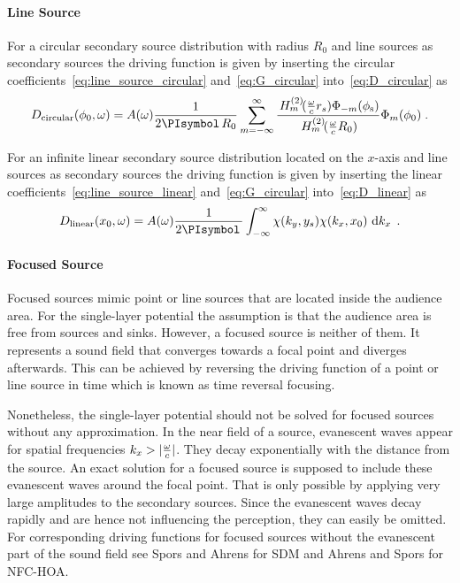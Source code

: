 \paragraph{Line Source}
%
For a circular secondary source distribution with radius $R_0$ and line sources
as secondary sources the driving function is given by inserting the
circular coefficients~\eqref{eq:line_source_circular} and~\eqref{eq:G_circular}
into~\eqref{eq:D_circular} as
%
\begin{equation}
    D_{\text{circular}}(\phi_0,\omega) = A(\omega) \frac{1}{2\PI R_0}
        \sum_{m=-\infty}^{\infty}
        \frac{\H{m}{2}(\omegac r_s) \Phi_{-m}(\phi_\text{s})}
        {\H{m}{2}(\omegac R_0)} \Phi_m(\phi_0) \qp
    \label{eq:D_nfchoa_ls_2D}
\end{equation}
%

For an infinite linear secondary source distribution located on the $x$-axis and
line sources as secondary sources the driving function is given by inserting the
linear coefficients~\eqref{eq:line_source_linear} and~\eqref{eq:G_circular}
into~\eqref{eq:D_linear} as
%
\begin{equation}
    D_\text{linear}(x_0,\omega) = A(\omega) \frac{1}{2\PI}
    \int_{-\infty}^\infty \chi(k_y,y_s) \chi(k_x,x_0) \, \D{k_x} \qp
\end{equation}
%


\paragraph{Focused Source}
%
Focused sources mimic point or line sources that are located inside the audience
area. For the single-layer potential the assumption is that the audience area is
free from sources and sinks. However, a focused source is neither of them. It
represents a sound field that converges towards a focal point and diverges
afterwards. This can be achieved by reversing the driving function of a point or
line source in time which is known as time reversal focusing.\autocite{Yon2003}

Nonetheless, the single-layer potential should not be solved for focused sources
without any approximation. In the near field of a source,
evanescent
waves\autocite[][p.\,24]{Williams1999} appear for spatial frequencies $k_x > |\frac{\omega}{c}|$.
They decay exponentially with the distance from the source. An exact solution for a focused
source is supposed to include these evanescent waves around the focal point.
That is only
possible by applying very large amplitudes to the secondary
sources.
Since the evanescent waves decay rapidly and are hence not
influencing the perception, they can easily be omitted.
For corresponding driving functions for focused sources without the
evanescent part of the sound field see Spors and
Ahrens for
\ac{SDM} and Ahrens and Spors for \ac{NFC-HOA}.

